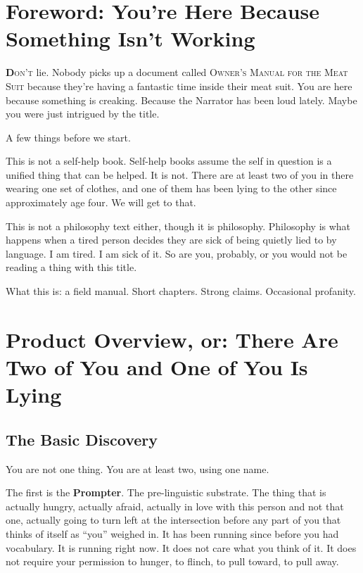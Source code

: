 \documentclass[11pt, letterpaper]{article}
\newcommand{\vocab}[1]{\textbf{\textcolor{meatred}{#1}}}
\begin{document}
\setcounter{page}{1}

\section*{Foreword: You're Here Because Something Isn't Working}

\lettrine[lines=3, findent=3pt, nindent=0pt]{\color{meatred}\bfseries D}{on't} lie. Nobody picks up a document called \textsc{Owner's Manual for the Meat Suit} because they're having a fantastic time inside their meat suit. You are here because something is creaking. Because the Narrator has been loud lately. Maybe you were just intrigued by the title.

A few things before we start.

This is not a self-help book. Self-help books assume the self in question is a unified thing that can be helped. It is not. There are at least two of you in there wearing one set of clothes, and one of them has been lying to the other since approximately age four. We will get to that.

This is not a philosophy text either, though it is philosophy. Philosophy is what happens when a tired person decides they are sick of being quietly lied to by language. I am tired. I am sick of it. So are you, probably, or you would not be reading a thing with this title.

What this is: a field manual. Short chapters. Strong claims. Occasional profanity. 

\section{Product Overview, or: There Are Two of You and One of You Is Lying}

\subsection{The Basic Discovery}

You are not one thing. You are at least two, using one name.

The first is the \vocab{Prompter}. The pre-linguistic substrate. The thing that is actually hungry, actually afraid, actually in love with this person and not that one, actually going to turn left at the intersection before any part of you that thinks of itself as ``you'' weighed in. It has been running since before you had vocabulary. It is running right now. It does not care what you think of it. It does not require your permission to hunger, to flinch, to pull toward, to pull away.
\end{document}
